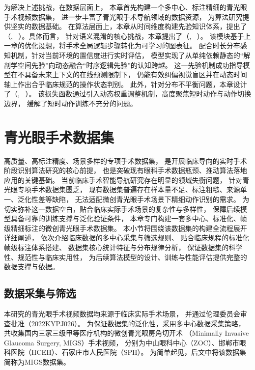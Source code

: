 为解决上述挑战，在数据层面上，
本章首先构建一个多中心、标注精细的青光眼手术视频数据集，
进一步丰富了青光眼手术导航领域的数据资源，
为算法研究提供坚实的数据基础。
在算法层面上，本章从时间维度构建先验知识体系，提出了\fulltwo（\fulltwoen, ~\sexytwo）。具体而言，
针对语义混淆的核心挑战，本章提出了\graphmodulefull（\graphmodulefullen, ~\graphmoduleshort）。
该模块基于上一章的优化设想，将手术全局逻辑步骤转化为可学习的图表征。
配合时长分布感知机制，针对当前环境的置信度进行实时评估，
模型实现了从单纯依赖静态的“解剖学空间先验”向动态融合“时序逻辑先验”的认知跨越。
这一先验机制成功指导模型在不具备未来上下文的在线预测限制下，
仍能有效纠偏视觉盲区并在动态时间轴上作出合乎临床规范的操作状态判别。
此外，针对分布不平衡问题，本章设计了\lossfull（\lossfullen, ~\lossshort）。
该损失函数通过引入动态权重调整机制，高度聚焦短时动作与动作切换边界，
缓解了短时动作训练不充分的问题。

\section{青光眼手术数据集}

高质量、高标注精度、场景多样的专项手术数据集，
是开展临床导向的实时手术阶段识别算法研究的核心前提，
也是突破现有眼科手术数据瓶颈、推动算法落地应用的关键基础。
当前临床手术智能导航研究存在明显的领域失衡问题，
针对青光眼专项手术数据集匮乏，
现有数据集普遍存在样本量不足、标注粗糙、来源单一、泛化性差等缺陷，
无法适配微创青光眼手术场景下精细动作识别的需求。
为切实弥补这一数据空白，贴合临床实际手术场景的复杂性与多样性，
保障后续模型具备可靠的训练支撑与泛化验证条件，
本章专门构建一套多中心、标准化、帧级精细标注的微创青光眼手术数据集。
本小节将围绕该数据集的构建全流程展开详细阐述，
依次介绍临床数据的多中心采集与筛选规则、
贴合临床规程的标准化帧级标注体系搭建、
数据集核心统计特征与分布规律分析，
保证数据集的科学性、规范性与临床实用性，
为后续算法模型的设计、训练与性能评估提供完整的数据支撑与依据。

\subsection{数据采集与筛选}
本研究的青光眼手术视频数据均来源于临床实际手术场景，
并通过伦理委员会审查批准（2022KYPJ026）。
为保证数据集的泛化性，采用多中心数据采集策略，
共收集国内三家三级甲等医疗机构的微创青光眼房角切开术
（Minimally Invasive Glaucoma Surgery, MIGS）手术视频，
分别为中山眼科中心（ZOC）、邯郸市眼科医院（HCEH）、石家庄市人民医院（SPH）。
为简单起见，后文中将该数据集简称为MIGS数据集。

